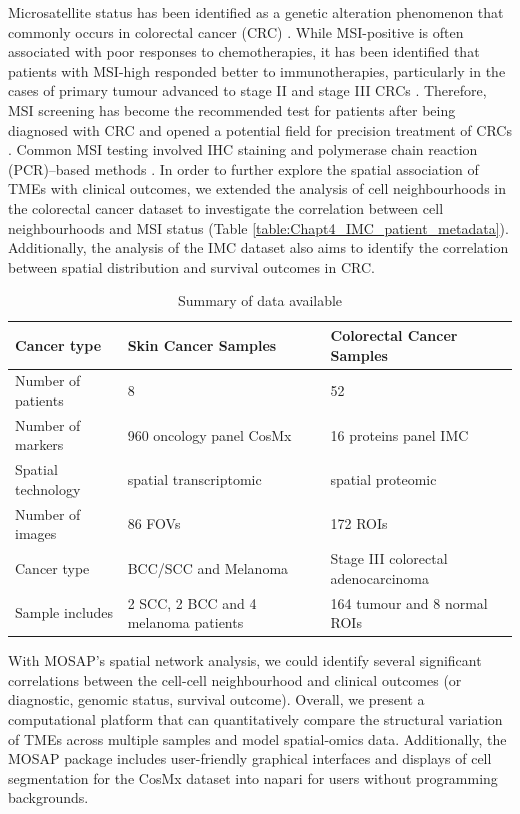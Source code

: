 Microsatellite status has been identified as a genetic alteration phenomenon that commonly occurs in colorectal cancer (CRC) \cite{battaglin2018microsatellite}. While MSI-positive is often associated with poor responses to chemotherapies, it has been identified that patients with MSI-high responded better to immunotherapies, particularly in the cases of primary tumour advanced to stage II and stage III CRCs \cite{battaglin2018microsatellite,kawakami2015microsatellite, li2021quantitative}. Therefore, MSI screening has become the recommended test for patients after being diagnosed with CRC and opened a potential field for precision treatment of CRCs \cite{svrcek2019msi}. Common MSI testing involved IHC staining and polymerase chain reaction (PCR)–based methods \cite{umar2004revised}. In order to further explore the spatial association of TMEs with clinical outcomes, we extended the analysis of cell neighbourhoods in the colorectal cancer dataset to investigate the correlation between cell neighbourhoods and MSI status (Table \ref{table:Chapt4_IMC_patient_metadata}). Additionally, the analysis of the IMC dataset also aims to identify the correlation between spatial distribution and survival outcomes in CRC. 
\begin{table}[ht]
\centering
\caption{Summary of data available}
\begin{tabular}{||P{4cm} || P{5cm} || P{5cm} || } 
 \hline
 Cancer type  & Skin Cancer Samples  & Colorectal Cancer Samples \\ [0.33ex] 
 \hline\hline
 Number of patients & 8 & 52  \\ 
 \hline
 Number of markers & 960 oncology panel CosMx  & 16 proteins panel IMC \\ 
 \hline
 Spatial technology & spatial transcriptomic & spatial proteomic  \\ 
 \hline
 Number of images & 86 FOVs &  172 ROIs \\
 \hline
 Cancer type & BCC/SCC and Melanoma & Stage III colorectal adenocarcinoma \\ [1ex] 
 \hline
 Sample includes  & 2 SCC, 2 BCC and 4 melanoma patients  & 164 tumour and 8 normal ROIs  \\ [1ex] 
 \hline
\end{tabular}
\label{table:Chapt4_DataInfor}
\end{table}
With MOSAP's spatial network analysis, we could identify several significant correlations between the cell-cell neighbourhood and clinical outcomes (or diagnostic, genomic status, survival outcome). Overall, we present a computational platform that can quantitatively compare the structural variation of TMEs across multiple samples and model spatial-omics data. Additionally, the MOSAP package includes user-friendly graphical interfaces and displays of cell segmentation for the CosMx dataset into napari \cite{chiu2022napari} for users without programming backgrounds. 
